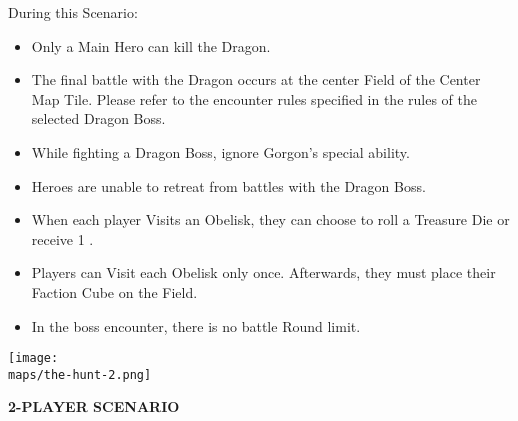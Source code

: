 \begin{multicols*}{2}
\columnbreak
During this Scenario:

\begin{itemize}
  \item Only a Main Hero can kill the Dragon.
  \item The final battle with the Dragon occurs at the center Field of the Center Map Tile.
    Please refer to the encounter rules specified in the rules of the selected Dragon Boss.
  \item While fighting a Dragon Boss, ignore Gorgon's special ability.
  \item Heroes are unable to retreat from battles with the Dragon Boss.
  \item When each player Visits an Obelisk, they can choose to roll a Treasure Die or receive 1 .
  \item Players can Visit each Obelisk only once.
    Afterwards, they must place their Faction Cube on the Field.
  \item In the boss encounter, there is no battle Round limit.
\end{itemize}
\columnbreak

\texttt{[image: \\maps/the-hunt-2.png]}

\medskip

{\footnotesize\centering\textbf{\MakeUppercase{2-PLAYER SCENARIO}}\par}


\end{multicols*}

\clearpage

